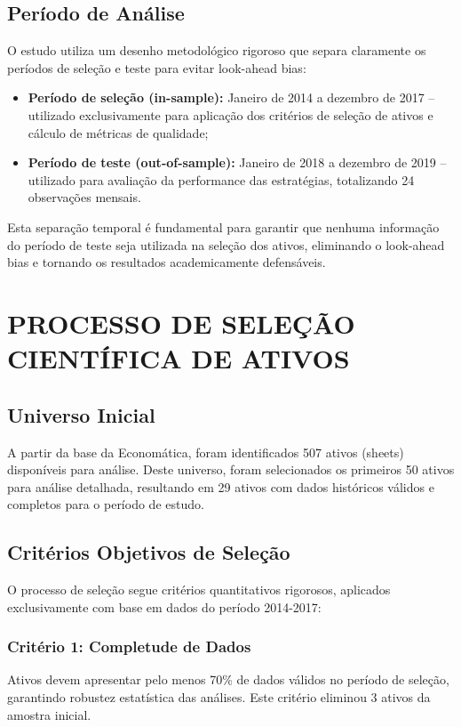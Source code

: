 \subsection{Período de Análise}

O estudo utiliza um desenho metodológico rigoroso que separa claramente os períodos de seleção e teste para evitar look-ahead bias:

\begin{itemize}
    \item \textbf{Período de seleção (in-sample):} Janeiro de 2014 a dezembro de 2017 -- utilizado exclusivamente para aplicação dos critérios de seleção de ativos e cálculo de métricas de qualidade;
    \item \textbf{Período de teste (out-of-sample):} Janeiro de 2018 a dezembro de 2019 -- utilizado para avaliação da performance das estratégias, totalizando 24 observações mensais.
\end{itemize}

Esta separação temporal é fundamental para garantir que nenhuma informação do período de teste seja utilizada na seleção dos ativos, eliminando o look-ahead bias e tornando os resultados academicamente defensáveis.

\section{PROCESSO DE SELEÇÃO CIENTÍFICA DE ATIVOS}

\subsection{Universo Inicial}

A partir da base da Economática, foram identificados 507 ativos (sheets) disponíveis para análise. Deste universo, foram selecionados os primeiros 50 ativos para análise detalhada, resultando em 29 ativos com dados históricos válidos e completos para o período de estudo.

\subsection{Critérios Objetivos de Seleção}

O processo de seleção segue critérios quantitativos rigorosos, aplicados exclusivamente com base em dados do período 2014-2017:

\subsubsection{Critério 1: Completude de Dados}
Ativos devem apresentar pelo menos 70\% de dados válidos no período de seleção, garantindo robustez estatística das análises. Este critério eliminou 3 ativos da amostra inicial.

